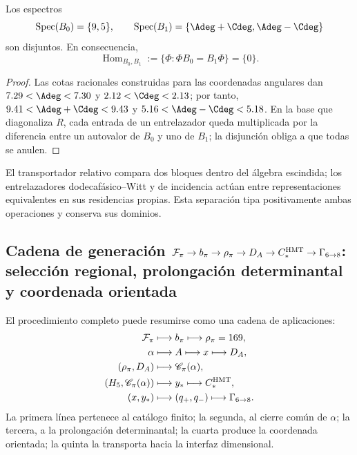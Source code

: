 \begin{theorem}
\label{p12-83-c13-s3:thm:no-go-entrelazador-bloques-split}
Los espectros
\[
 \operatorname{Spec}(B_0)=\{9,5\},\qquad
 \operatorname{Spec}(B_1)=\{\Adeg+\Cdeg,\Adeg-\Cdeg\}
\]
son disjuntos. En consecuencia,
\[
 \operatorname{Hom}_{B_0,B_1}
 :=\{\Phi:\Phi B_0=B_1\Phi\}=\{0\}.
\]
\end{theorem}

\begin{proof}
Las cotas racionales construidas para las coordenadas angulares dan
\(7.29<\Adeg<7.30\) y \(2.12<\Cdeg<2.13\); por tanto,
\(9.41<\Adeg+\Cdeg<9.43\) y
\(5.16<\Adeg-\Cdeg<5.18\). En la base que diagonaliza \(R\), cada entrada
de un entrelazador queda multiplicada por la diferencia entre un autovalor
de \(B_0\) y uno de \(B_1\); la disjunción obliga a que todas se anulen.
\end{proof}

El transportador relativo compara dos bloques dentro del álgebra escindida;
los entrelazadores dodecafásico--Witt y de incidencia actúan entre
representaciones equivalentes en sus residencias propias. Esta separación
tipa positivamente ambas operaciones y conserva sus dominios.

\subsection{Cadena de generación \(\mathcal F_\pi\to b_\pi\to\rho_\pi\to D_A\to C_*^{\rm HMT}\to\Gamma_{6\to8}\): selección regional, prolongación determinantal y coordenada orientada}

El procedimiento completo puede resumirse como una cadena de aplicaciones:
\[
\begin{aligned}
\mathcal F_\pi
&\longmapsto b_\pi
\longmapsto\rho_\pi=169,\\
\alpha
&\longmapsto A
\longmapsto x
\longmapsto D_A,\\
(\rho_\pi,D_A)
&\longmapsto\mathscr C_\pi(\alpha),\\
(H_5,\mathscr C_\pi(\alpha))
&\longmapsto y_*
\longmapsto C_*^{\rm HMT},\\
(x,y_*)
&\longmapsto(q_+,q_-)
\longmapsto\Gamma_{6\to8}.
\end{aligned}
\]
La primera línea pertenece al catálogo finito; la segunda, al cierre común de
\(\alpha\); la tercera, a la prolongación determinantal; la cuarta produce la
coordenada orientada; la quinta la transporta hacia la interfaz dimensional.

